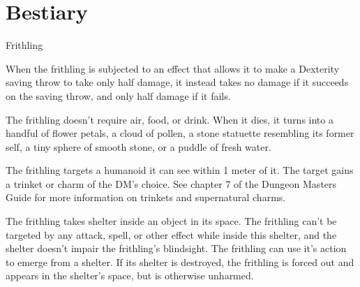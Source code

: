 \section{Bestiary}

\begin{DndMonster}[float*=b,width=\textwidth + 8pt]{Frithling}
\begin{multicols}{2}

    \DndMonsterBasics[
        armor-class = {15},
        hit-points  = {\DndDice{2d4}},
        speed       = {4 mt., climb 4 mt., swim 4 mt.},
    ]

    \DndMonsterAbilityScores[
        str = 1,
        dex = 20,
        con = 10,
        int = 14,
        wis = 16,
        cha = 16,
    ]

    \DndMonsterDetails[
        skills = {Acrobatics +7, Perception +7, Stealth +7},
        senses = {blindsight 12 mt., passive Perception 17},
        languages = {---},
        challenge = 0,
    ]

        When the frithling is subjected to an effect that allows it to make a Dexterity saving throw to take only half damage, it instead takes no damage if it succeeds on the saving throw, and only half damage if it fails.

        The frithling doesn't require air, food, or drink.
        When it dies, it turns into a handful of flower petals, a cloud of pollen, a stone statuette resembling its former self, a tiny sphere of smooth stone, or a puddle of fresh water.

        The frithling targets a humanoid it can see within 1 meter of it.
        The target gains a trinket or charm of the DM's choice.
        See chapter 7 of the Dungeon Masters Guide for more information on trinkets and supernatural charms.

        The frithling takes shelter inside an object in its space.
        The frithling can't be targeted by any attack, spell, or other effect while inside this shelter, and the shelter doesn't impair the frithling's blindsight.
        The frithling can use it's action to emerge from a shelter.
        If its shelter is destroyed, the frithling is forced out and appears in the shelter's space, but is otherwise unharmed.
\end{multicols}
\end{DndMonster}
